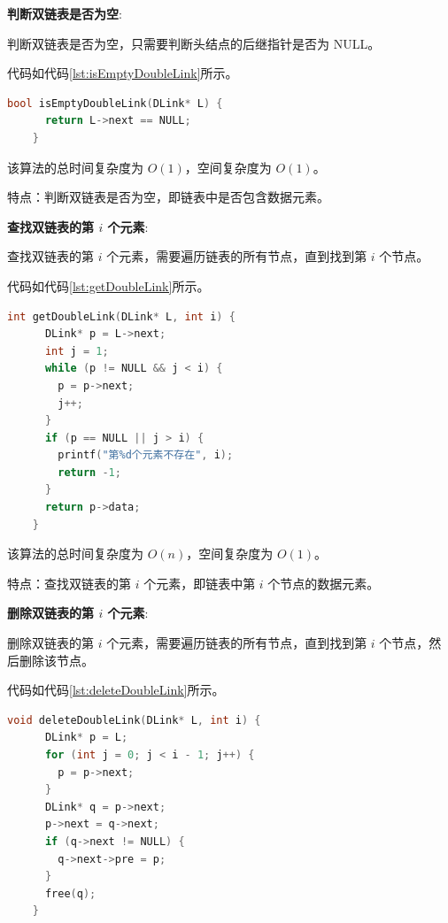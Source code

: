 \documentclass[lang=cn,newtx,10pt,scheme=chinese]{elegantbook}
\begin{document}
  \textbf{判断双链表是否为空}:

  判断双链表是否为空，只需要判断头结点的后继指针是否为 NULL。

  代码如代码\ref{lst:isEmptyDoubleLink}所示。

  \begin{lstlisting}[language=C++, caption={判断双链表是否为空示例代码}, label={lst:isEmptyDoubleLink}]
    bool isEmptyDoubleLink(DLink* L) {
      return L->next == NULL;
    }
  \end{lstlisting}

  该算法的总时间复杂度为 $O(1)$，空间复杂度为 $O(1)$。

  特点：判断双链表是否为空，即链表中是否包含数据元素。

  \textbf{查找双链表的第 $i$ 个元素}:

  查找双链表的第 $i$ 个元素，需要遍历链表的所有节点，直到找到第 $i$ 个节点。

  代码如代码\ref{lst:getDoubleLink}所示。

  \begin{lstlisting}[language=C++, caption={查找双链表的第 $i$ 个元素示例代码}, label={lst:getDoubleLink}]
    int getDoubleLink(DLink* L, int i) {
      DLink* p = L->next;
      int j = 1;
      while (p != NULL && j < i) {
        p = p->next;
        j++;
      }
      if (p == NULL || j > i) {
        printf("第%d个元素不存在", i);
        return -1;
      }
      return p->data;
    }
  \end{lstlisting}

  该算法的总时间复杂度为 $O(n)$，空间复杂度为 $O(1)$。

  特点：查找双链表的第 $i$ 个元素，即链表中第 $i$ 个节点的数据元素。

  \textbf{删除双链表的第 $i$ 个元素}:

  删除双链表的第 $i$ 个元素，需要遍历链表的所有节点，直到找到第 $i$ 个节点，然后删除该节点。

  代码如代码\ref{lst:deleteDoubleLink}所示。

  \begin{lstlisting}[language=C++, caption={删除双链表的第 $i$ 个元素示例代码}, label={lst:deleteDoubleLink}]
    void deleteDoubleLink(DLink* L, int i) {
      DLink* p = L;
      for (int j = 0; j < i - 1; j++) {
        p = p->next;
      }
      DLink* q = p->next;
      p->next = q->next;
      if (q->next != NULL) {
        q->next->pre = p;
      }
      free(q);
    }
  \end{lstlisting}
\end{document}
